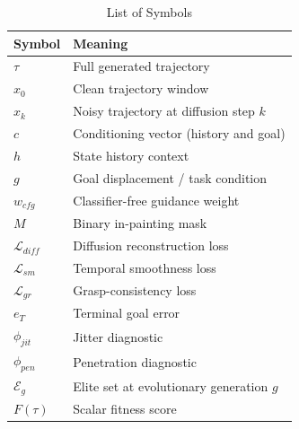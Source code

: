 \begin{table}[!h]
\centering
\caption*{List of Symbols}
\begin{tabular}{ll}
\toprule
Symbol & Meaning \\
\midrule
$\tau$ & Full generated trajectory \\
$x_0$ & Clean trajectory window \\
$x_k$ & Noisy trajectory at diffusion step $k$ \\
$c$ & Conditioning vector (history and goal) \\
$h$ & State history context \\
$g$ & Goal displacement / task condition \\
$w_{cfg}$ & Classifier-free guidance weight \\
$M$ & Binary in-painting mask \\
$\mathcal{L}_{diff}$ & Diffusion reconstruction loss \\
$\mathcal{L}_{sm}$ & Temporal smoothness loss \\
$\mathcal{L}_{gr}$ & Grasp-consistency loss \\
$e_T$ & Terminal goal error \\
$\phi_{jit}$ & Jitter diagnostic \\
$\phi_{pen}$ & Penetration diagnostic \\
$\mathcal{E}_g$ & Elite set at evolutionary generation $g$ \\
$F(\tau)$ & Scalar fitness score \\
\bottomrule
\end{tabular}
\end{table}
